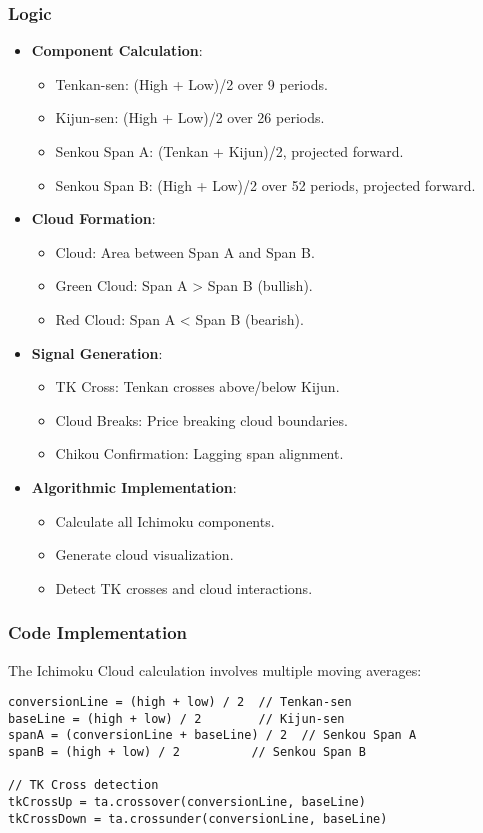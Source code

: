 \documentclass[12pt]{article}
\begin{document}
\subsubsection{Logic}
\begin{itemize}
\item \textbf{Component Calculation}:
  \begin{itemize}
  \item Tenkan-sen: (High + Low)/2 over 9 periods.
  \item Kijun-sen: (High + Low)/2 over 26 periods.
  \item Senkou Span A: (Tenkan + Kijun)/2, projected forward.
  \item Senkou Span B: (High + Low)/2 over 52 periods, projected forward.
  \end{itemize}
\item \textbf{Cloud Formation}:
  \begin{itemize}
  \item Cloud: Area between Span A and Span B.
  \item Green Cloud: Span A > Span B (bullish).
  \item Red Cloud: Span A < Span B (bearish).
  \end{itemize}
\item \textbf{Signal Generation}:
  \begin{itemize}
  \item TK Cross: Tenkan crosses above/below Kijun.
  \item Cloud Breaks: Price breaking cloud boundaries.
  \item Chikou Confirmation: Lagging span alignment.
  \end{itemize}
\item \textbf{Algorithmic Implementation}:
  \begin{itemize}
  \item Calculate all Ichimoku components.
  \item Generate cloud visualization.
  \item Detect TK crosses and cloud interactions.
  \end{itemize}
\end{itemize}

\subsubsection{Code Implementation}
The Ichimoku Cloud calculation involves multiple moving averages:

\begin{lstlisting}[language=Pine, caption=Pine Script Code for Ichimoku Components]
conversionLine = (high + low) / 2  // Tenkan-sen
baseLine = (high + low) / 2        // Kijun-sen  
spanA = (conversionLine + baseLine) / 2  // Senkou Span A
spanB = (high + low) / 2          // Senkou Span B

// TK Cross detection
tkCrossUp = ta.crossover(conversionLine, baseLine)
tkCrossDown = ta.crossunder(conversionLine, baseLine)
\end{lstlisting}
\end{document}
